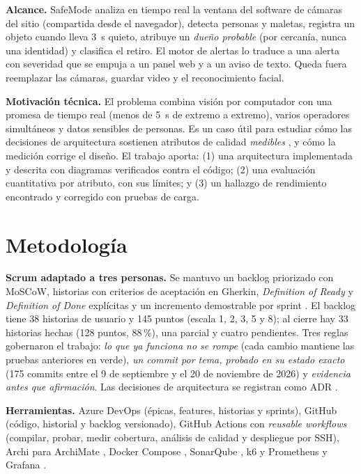 \documentclass[conference]{IEEEtran}
\begin{document}
\textbf{Alcance.} SafeMode analiza en tiempo real la ventana del software de cámaras del sitio (compartida desde el navegador), detecta personas y
maletas, registra un objeto cuando lleva 3~s quieto, atribuye un \emph{dueño probable} (por cercanía, nunca una identidad) y clasifica el retiro. El motor
de alertas lo traduce a una alerta con severidad que se empuja a un panel web y a un aviso de texto. Queda fuera reemplazar las cámaras, guardar video
y el reconocimiento facial.

\textbf{Motivación técnica.} El problema combina visión por computador con una promesa de tiempo real (menos de 5~s de extremo a extremo), varios operadores
simultáneos y datos sensibles de personas. Es un caso útil para estudiar cómo las decisiones de arquitectura sostienen atributos de calidad
\emph{medibles} \cite{bass}, y cómo la medición corrige el diseño. El trabajo aporta: (1) una arquitectura implementada y descrita con diagramas
verificados contra el código; (2) una evaluación cuantitativa por atributo, con sus límites; y (3) un hallazgo de rendimiento encontrado y
corregido con pruebas de carga.

\section{Metodología}
\textbf{Scrum adaptado a tres personas.} Se mantuvo un backlog priorizado con MoSCoW, historias con criterios de aceptación en Gherkin, \emph{Definition of
Ready} y \emph{Definition of Done} explícitas y un incremento demostrable por sprint \cite{scrum}. El backlog tiene 38 historias de usuario y 145 puntos
(escala 1, 2, 3, 5 y 8); al cierre hay 33 historias hechas (128 puntos, 88\,\%), una parcial y cuatro pendientes. Tres reglas gobernaron el trabajo:
\emph{lo que ya funciona no se rompe} (cada cambio mantiene las pruebas anteriores en verde), \emph{un commit por tema, probado en su estado exacto}
(175 commits entre el 9 de septiembre y el 20 de noviembre de 2026) y \emph{evidencia antes que afirmación}. Las decisiones de arquitectura se registran
como ADR \cite{adr}.

\textbf{Herramientas.} Azure DevOps (épicas, features, historias y sprints), GitHub (código, historial y backlog versionado), GitHub Actions con \emph{reusable
workflows} (compilar, probar, medir cobertura, análisis de calidad y despliegue por SSH), Archi para ArchiMate \cite{archimate}, Docker Compose \cite{docker},
SonarQube \cite{sonar}, k6 \cite{k6} y Prometheus y Grafana \cite{prom}.
\end{document}
